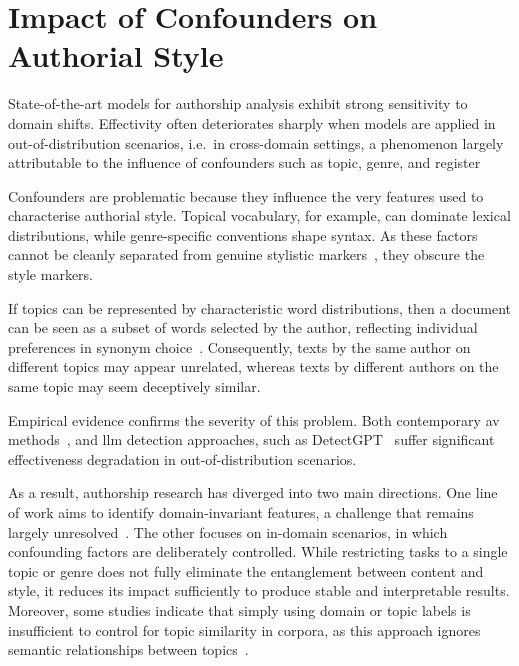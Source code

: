 \section{Impact of Confounders on Authorial Style}
\label{sec:contextual_factors}

State-of-the-art models for authorship analysis exhibit strong sensitivity to domain shifts. 
Effectivity often deteriorates sharply when models are applied in out-of-distribution scenarios, i.e.\ in cross-domain settings, a phenomenon largely attributable to the influence of confounders such as topic, genre, and register~\citep{Sundararajan_style_18,bischoff_importance_2020}

Confounders are problematic because they influence the very features used to characterise authorial style. 
Topical vocabulary, for example, can dominate lexical distributions, while genre-specific conventions shape syntax. 
As these factors cannot be cleanly separated from genuine stylistic markers~\citep{bischoff_importance_2020}, they obscure the style markers.

If topics can be represented by characteristic word distributions, then a document can be seen as a subset of words selected by the author, reflecting individual preferences in synonym choice~\citep{altakrori_topic_2021}. 
Consequently, texts by the same author on different topics may appear unrelated, whereas texts by different authors on the same topic may seem deceptively similar.

Empirical evidence confirms the severity of this problem.
Both contemporary \ac{av} methods~\citep{Thomas_cross_topic_24}, and \ac{llm} detection approaches, such as DetectGPT~\citep{mitchell_detectgpt_2023,Wu_ODD_challenges_2025} suffer significant effectiveness degradation in out-of-distribution scenarios.

As a result, authorship research has diverged into two main directions. 
One line of work aims to identify domain-invariant features, a challenge that remains largely unresolved~\citep{bischoff_importance_2020}. 
The other focuses on in-domain scenarios, in which confounding factors are deliberately controlled. %
While restricting tasks to a single topic or genre does not fully eliminate the entanglement between content and style, it reduces its impact sufficiently to produce stable and interpretable results. 
Moreover, some studies indicate that simply using domain or topic labels is insufficient to control for topic similarity in corpora, as this approach ignores semantic relationships between topics~\citep{sawatphol_cross_topic_av_24}.
